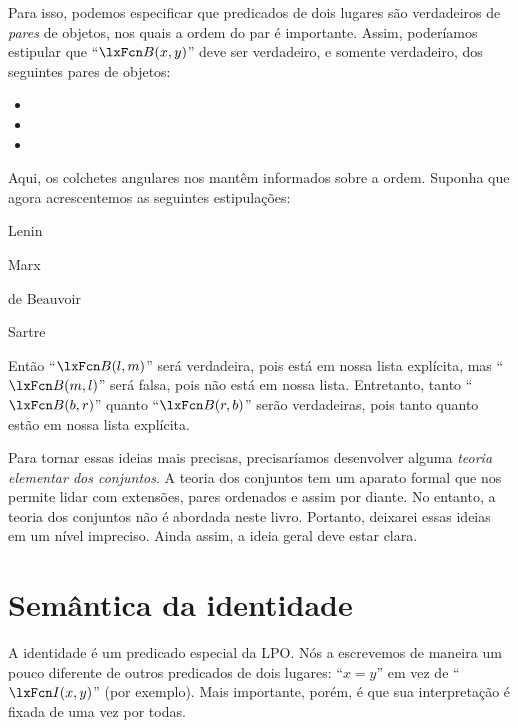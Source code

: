 Para isso, podemos especificar que predicados de dois lugares são verdadeiros de \emph{pares} de objetos, nos quais a ordem do par é importante. Assim, poderíamos estipular que \textquotedblleft $\atom{B}{x,y}$\textquotedblright{} deve ser verdadeiro, e somente verdadeiro, dos seguintes pares de objetos:
	\begin{itemize}
		\item {}
		\item {}
		\item {}
	\end{itemize}
Aqui, os colchetes angulares nos mantêm informados sobre a ordem. Suponha que agora acrescentemos as seguintes estipulações:
	\begin{ekey}
		\item[l] Lenin
		\item[m] Marx
		\item[b] de Beauvoir
		\item[r] Sartre
	\end{ekey}
Então \textquotedblleft $\atom{B}{l,m}$\textquotedblright{} será verdadeira, pois  está em nossa lista explícita, mas \textquotedblleft $\atom{B}{m,l}$\textquotedblright{} será falsa, pois  não está em nossa lista. Entretanto, tanto \textquotedblleft $\atom{B}{b,r}$\textquotedblright{} quanto \textquotedblleft $\atom{B}{r,b}$\textquotedblright{} serão verdadeiras, pois tanto  quanto  estão em nossa lista explícita.

Para tornar essas ideias mais precisas, precisaríamos desenvolver alguma \emph{teoria elementar dos conjuntos}. A teoria dos conjuntos tem um aparato formal que nos permite lidar com extensões, pares ordenados e assim por diante. No entanto, a teoria dos conjuntos não é abordada neste livro. Portanto, deixarei essas ideias em um nível impreciso. Ainda assim, a ideia geral deve estar clara.


\section{Semântica da identidade}
A identidade é um predicado especial da LPO. Nós a escrevemos de maneira um pouco diferente de outros predicados de dois lugares: \textquotedblleft $x=y$\textquotedblright{} em vez de \textquotedblleft $\atom{I}{x,y}$\textquotedblright{} (por exemplo). Mais importante, porém, é que sua interpretação é fixada de uma vez por todas.

